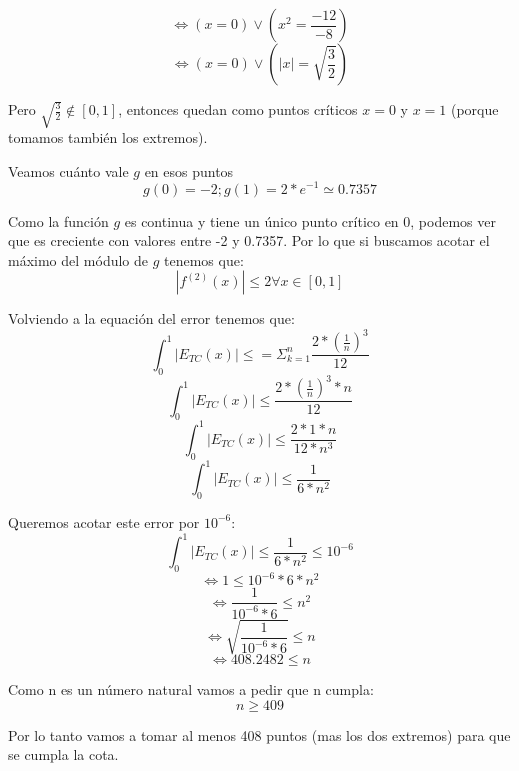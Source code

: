 \documentclass[a4paper,10pt]{article}
\begin{document}
\begin{equation}
	\Leftrightarrow (x=0) \vee (x^2 = \frac{-12}{-8})
\end{equation}
\begin{equation}
	\Leftrightarrow (x=0) \vee (|x| = \sqrt{\frac{3}{2}})
\end{equation}
\par Pero $\sqrt{\frac{3}{2}} \notin [0,1]$, entonces quedan como puntos críticos $x=0$ y $x=1$ (porque tomamos también los extremos).
\par Veamos cuánto vale $g$ en esos puntos
\begin{equation}
	g(0) = -2 ; g(1) = 2*e^{-1} \simeq 0.7357
\end{equation}
\par Como la función $g$ es continua y tiene un único punto crítico en 0, podemos ver que es creciente con valores entre -2 y 0.7357. Por lo que si buscamos acotar el máximo del módulo de $g$ tenemos que:
\begin{equation}
	| f^{(2)}(x) | \leq 2 \forall x \in [0,1]
\end{equation}
\par Volviendo a la equación del error tenemos que:
\begin{equation}
	\int_0^1 \left| E_{TC}(x) \right| \leq = \Sigma_{k=1}^n \frac{2 * (\frac{1}{n})^3}{12}
\end{equation}
\begin{equation}
	\int_0^1 \left| E_{TC}(x) \right| \leq \frac{2 * (\frac{1}{n})^3 * n}{12}
\end{equation}
\begin{equation}
	\int_0^1 \left| E_{TC}(x) \right| \leq \frac{2 * 1 * n}{12 * n^3}
\end{equation}
\begin{equation}
	\int_0^1 \left| E_{TC}(x) \right| \leq \frac{1}{6 * n^2}
\end{equation}
\par Queremos acotar este error por $10^{-6}$:
\begin{equation}
	\int_0^1 \left| E_{TC}(x) \right| \leq \frac{1}{6 * n^2} \leq 10^{-6}
\end{equation}
\begin{equation}
	\Leftrightarrow 1 \leq 10^{-6} * 6 * n^2
\end{equation}
\begin{equation}
	\Leftrightarrow \frac{1}{10^{-6} * 6} \leq n^2
\end{equation}
\begin{equation}
	\Leftrightarrow \sqrt{\frac{1}{10^{-6} * 6}} \leq n
\end{equation}
\begin{equation}
	\Leftrightarrow 408.2482 \leq n
\end{equation}
\par Como n es un número natural vamos a pedir que n cumpla:
\begin{equation}
	n \geq 409
\end{equation}
\par Por lo tanto vamos a tomar al menos 408 puntos (mas los dos extremos) para que se cumpla la cota.
\end{document}

